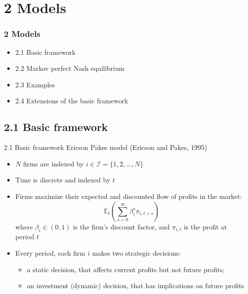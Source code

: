 \documentclass[aspectratio=169]{beamer}  %
\begin{document}
\section{2 Models}
\begin{frame}
\frametitle{2 Models}
    \begin{itemize}
        \item 2.1 Basic framework
        \item 2.2 Markov perfect Nash equilibrium
        \item 2.3 Examples
        \item 2.4 Extensions of the basic framework
    \end{itemize}
\end{frame}

\subsection{2.1 Basic framework}
\begin{frame}
{2.1 Basic framework}
Ericson Pakes model (Ericson and Pakes, 1995)
    \begin{itemize}
        \item \(N\) firms are indexed by \(i \in \mathcal{I} = \{1, 2, \ldots, N\}\)
        \item Time is discrete and indexed by \(t\)
        \item Firms maximize their expected and discounted flow of profits in the market:
            \[
            \mathbb{E}_t \left( \sum_{s=0}^{\infty} \beta_i^s \pi_{i,t+s} \right)
            \]
            where \(\beta_i \in (0, 1)\) is the firm's discount factor, and \(\pi_{i,t}\) is the profit at period \(t\)
        \item Every period, each firm \(i\) makes two strategic decisions: 
         \begin{itemize}
            \item a static decision, that affects current profits but not future profits; 
            \item  an investment (dynamic) decision, that has implications on future profits
        \end{itemize}
    \end{itemize}
\end{frame}
\end{document}

